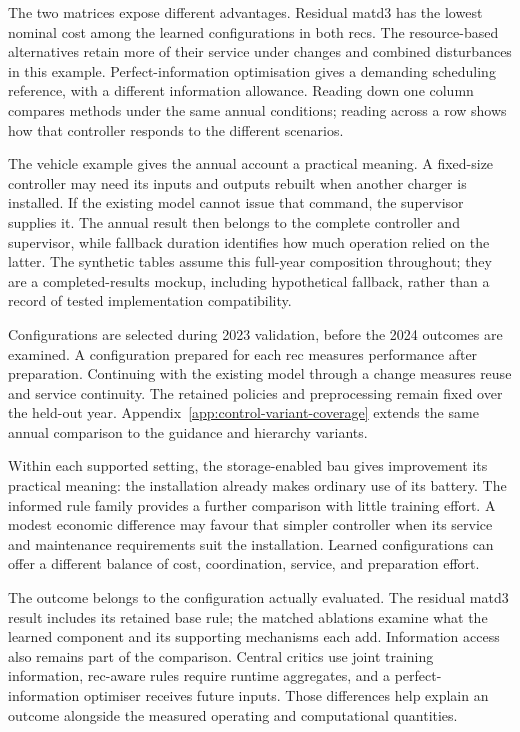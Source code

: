 



\illustrativereading The two matrices expose different advantages. Residual \gls{matd3} has the lowest nominal cost among the learned configurations in both \glspl{rec}. The resource-based alternatives retain more of their service under changes and combined disturbances in this example. Perfect-information optimisation gives a demanding scheduling reference, with a different information allowance. Reading down one column compares methods under the same annual conditions; reading across a row shows how that controller responds to the different scenarios.

The vehicle example gives the annual account a practical meaning. A fixed-size controller may need its inputs and outputs rebuilt when another charger is installed. If the existing model cannot issue that command, the supervisor supplies it. The annual result then belongs to the complete controller and supervisor, while fallback duration identifies how much operation relied on the latter. The synthetic tables assume this full-year composition throughout; they are a completed-results mockup, including hypothetical fallback, rather than a record of tested implementation compatibility.

Configurations are selected during 2023 validation, before the 2024 outcomes are examined. A configuration prepared for each \gls{rec} measures performance after preparation. Continuing with the existing model through a change measures reuse and service continuity. The retained policies and preprocessing remain fixed over the held-out year. Appendix~\ref{app:control-variant-coverage} extends the same annual comparison to the guidance and hierarchy variants.

Within each supported setting, the storage-enabled \gls{bau} gives improvement its practical meaning: the installation already makes ordinary use of its battery. The informed rule family provides a further comparison with little training effort. A modest economic difference may favour that simpler controller when its service and maintenance requirements suit the installation. Learned configurations can offer a different balance of cost, coordination, service, and preparation effort.

The outcome belongs to the configuration actually evaluated. The residual \gls{matd3} result includes its retained base rule; the matched ablations examine what the learned component and its supporting mechanisms each add. Information access also remains part of the comparison. Central critics use joint training information, \gls{rec}-aware rules require runtime aggregates, and a perfect-information optimiser receives future inputs. Those differences help explain an outcome alongside the measured operating and computational quantities.

